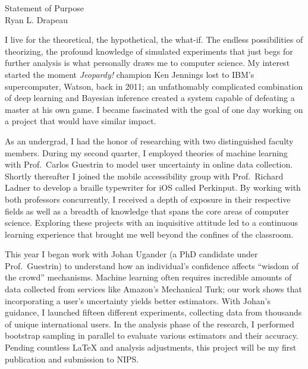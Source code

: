 \setlength{\oddsidemargin}{0in}
\setlength{\evensidemargin}{0in}
\setlength{\textwidth}{6.5in}
\setlength{\topmargin}{-.65in}
\setlength{\textheight}{9.5in}
\pagestyle{empty}



\begin{center}
    {\Large Statement of Purpose}\\[3 mm]
    {\large Ryan L. Drapeau}
\end{center}

I live for the theoretical, the hypothetical, the what-if. The endless possibilities of theorizing,
the profound knowledge of simulated experiments that just begs for further analysis is what personally draws me to computer science. My interest started the moment {\it{Jeopardy!}} champion Ken Jennings lost to IBM's supercomputer, Watson, back in 2011; an unfathomably complicated combination of deep learning and Bayesian inference created a system capable of defeating a master at his own game. I became fascinated with the goal of one day working on a project that would have similar impact.\vspace{2 mm}

As an undergrad, I had the honor of researching with two distinguished faculty members. During my second quarter, I employed theories of machine learning with Prof.\ Carlos Guestrin to model user uncertainty in online data collection. Shortly thereafter I joined the mobile accessibility group with Prof.\ Richard Ladner to develop a braille typewriter for iOS called Perkinput. By working with both professors concurrently, I received a depth of exposure in their respective fields as well as a breadth of knowledge that spans the core areas of computer science. Exploring these projects with an inquisitive attitude led to a continuous learning experience that brought me well beyond the confines of the classroom.\vspace{2 mm}

This year I began work with Johan Ugander (a PhD candidate under Prof.\ Guestrin) to understand how an individual's confidence affects ``wisdom of the crowd'' mechanisms. Machine learning often requires incredible amounts of data collected from services like Amazon's Mechanical Turk; our work shows that incorporating a user's uncertainty yields better estimators. With Johan's guidance, I launched fifteen different experiments, collecting data from thousands of unique international users. In the analysis phase of the research, I performed bootstrap sampling in parallel to evaluate various estimators and their accuracy. Pending countless \LaTeX{} and analysis adjustments, this project will be my first publication and submission to NIPS.\vspace{2 mm}

